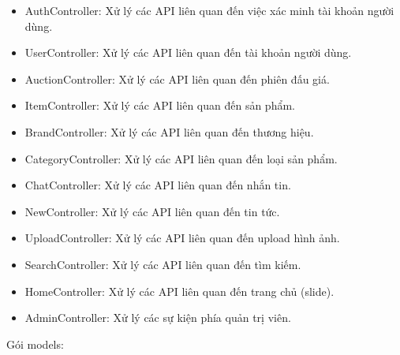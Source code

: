 \documentclass[../DoAn.tex]{subfiles}
\begin{document}
\begin{itemize}
    \item AuthController: Xử lý các API liên quan đến việc xác minh tài khoản người dùng.
    \item UserController: Xử lý các API liên quan đến tài khoản người dùng.
    \item AuctionController: Xử lý các API liên quan đến phiên đấu giá.
    \item ItemController: Xử lý các API liên quan đến sản phẩm.
    \item BrandController: Xử lý các API liên quan đến thương hiệu.
    \item CategoryController: Xử lý các API liên quan đến loại sản phẩm.
    \item ChatController: Xử lý các API liên quan đến nhắn tin.
    \item NewController: Xử lý các API liên quan đến tin tức.
    \item UploadController: Xử lý các API liên quan đến upload hình ảnh.
    \item SearchController: Xử lý các API liên quan đến tìm kiếm.
    \item HomeController: Xử lý các API liên quan đến trang chủ (slide).
    \item AdminController: Xử lý các sự kiện phía quản trị viên.
\end{itemize}
Gói models:
\end{document}
